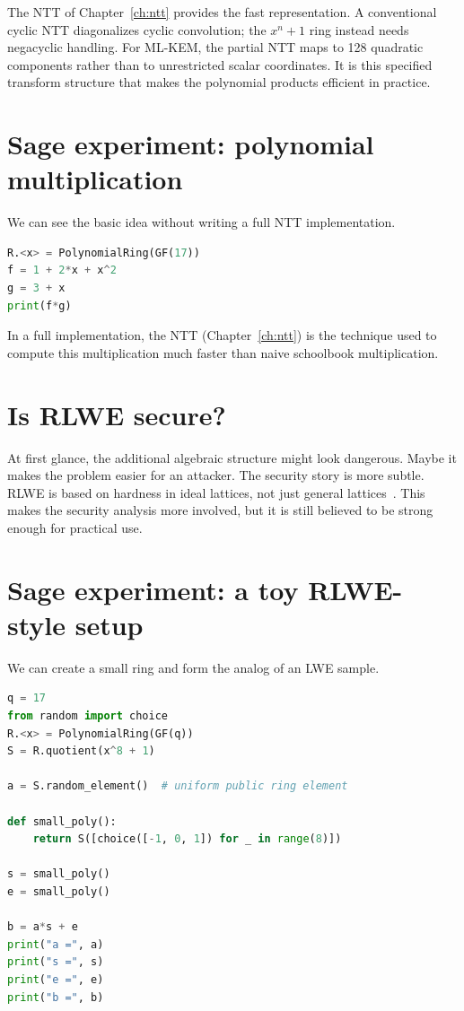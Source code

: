 The NTT of Chapter~\ref{ch:ntt} provides the fast representation. A conventional cyclic NTT diagonalizes cyclic convolution; the $x^n+1$ ring instead needs negacyclic handling. For ML-KEM, the partial NTT maps to 128 quadratic components rather than to unrestricted scalar coordinates. It is this specified transform structure that makes the polynomial products efficient in practice.

\section{Sage experiment: polynomial multiplication}

We can see the basic idea without writing a full NTT implementation.

\begin{lstlisting}[language=Python]
R.<x> = PolynomialRing(GF(17))
f = 1 + 2*x + x^2
g = 3 + x
print(f*g)
\end{lstlisting}

In a full implementation, the NTT (Chapter~\ref{ch:ntt}) is the technique used to compute this multiplication much faster than naive schoolbook multiplication.

\section{Is RLWE secure?}

At first glance, the additional algebraic structure might look dangerous. Maybe it makes the problem easier for an attacker. The security story is more subtle. RLWE is based on hardness in ideal lattices, not just general lattices~\cite{lpr2010}. This makes the security analysis more involved, but it is still believed to be strong enough for practical use.

\section{Sage experiment: a toy RLWE-style setup}

We can create a small ring and form the analog of an LWE sample.

\begin{lstlisting}[language=Python]
q = 17
from random import choice
R.<x> = PolynomialRing(GF(q))
S = R.quotient(x^8 + 1)

a = S.random_element()  # uniform public ring element

def small_poly():
    return S([choice([-1, 0, 1]) for _ in range(8)])

s = small_poly()
e = small_poly()

b = a*s + e
print("a =", a)
print("s =", s)
print("e =", e)
print("b =", b)
\end{lstlisting}

